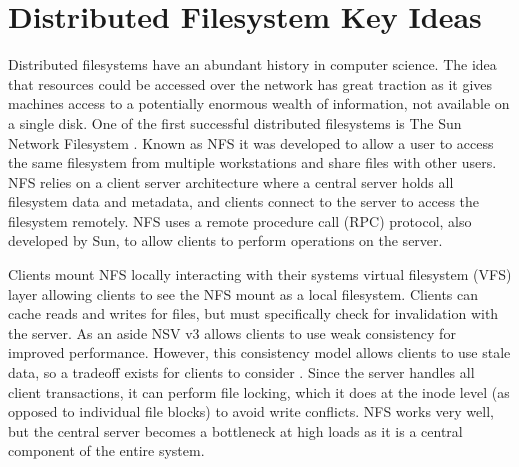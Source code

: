 \section{Distributed Filesystem Key Ideas}

Distributed filesystems have an abundant history in computer science. The idea that resources could be accessed over the network has great traction as it gives machines access to a potentially enormous wealth of information, not available on a single disk. One of the first successful distributed filesystems is The Sun Network Filesystem \cite{Sandberg1985}. Known as NFS it was developed to allow a user to access the same filesystem from multiple workstations and share files with other users. NFS relies on a client server architecture where a central server holds all filesystem data and metadata, and clients connect to the server to access the filesystem remotely. NFS uses a remote procedure call (RPC) protocol, also developed by Sun, to allow clients to perform operations on the server. 

Clients mount NFS locally interacting with their systems virtual filesystem (VFS) layer allowing clients to see the NFS mount as a local filesystem. Clients can cache reads and writes for files, but must specifically check for invalidation with the server. As an aside NSV v3 allows clients to use weak consistency for improved performance. However, this consistency model allows clients to use stale data, so a tradeoff exists for clients to consider \cite{Pawlowski1994}. Since the server handles all client transactions, it can perform file locking, which it does at the inode level (as opposed to individual file blocks) to avoid write conflicts. NFS works very well, but the central server becomes a bottleneck at high loads as it is a central component of the entire system. 

